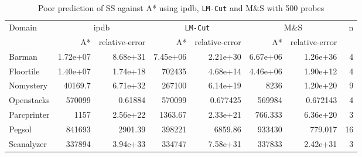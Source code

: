 

\begin{table}[!htb]
\footnotesize
\centering
\caption{Poor prediction of SS against A* using ipdb, \texttt{LM-Cut} and M$\&$S with 500 probes}
\label{tb:ipdb_lmcut_mands}
\begin{tabular}{lrrrrrrr}
\hline
\multirow{2}{*}{Domain} & \multicolumn{2}{c}{ipdb} & \multicolumn{2}{c}{\texttt{LM-Cut}} & \multicolumn{2}{c}{M$\&$S} & \multirow{2}{*}{n} \\ \cline{2-7}
                     & A*          & relative-error         & A*                & relative-error                & A*           & relative-error          &                    \\ \hline
Barman               & 1.72e+07    & 8.68e+31   & 7.45e+06          & 2.21e+30          & 6.67e+06     & 1.26e+36    & 4                  \\
Floortile            & 1.40e+07    & 1.74e+18   & 702435            & 4.68e+14          & 4.46e+06     & 1.90e+12    & 4                  \\
Nomystery            & 40169.7     & 6.71e+32   & 267100            & 6.14e+19          & 8236         & 1.20e+20    & 9                  \\
Openstacks           & 570099      & 0.61884    & 570099            & 0.677425          & 569984       & 0.672143    & 4                  \\
Parcprinter          & 1157        & 2.56e+22   & 1363.67           & 2.33e+21          & 766.333      & 6.36e+20    & 3                  \\
Pegsol               & 841693      & 2901.39    & 398221            & 6859.86           & 933430       & 779.017     & 16                 \\
Scanalyzer           & 337894      & 3.94e+33   & 334747            & 7.58e+31          & 337833       & 2.42e+31    & 3                  \\

\end{tabular}
\end{table}
